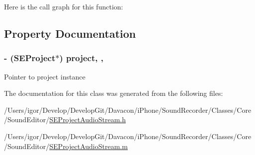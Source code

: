 Here is the call graph for this function\-:




\subsection{Property Documentation}
\hypertarget{interface_s_e_project_audio_stream_ac6d00d41ed2dffb56d3a00533a26e6cd}{
\subsubsection[{project}]{\setlength{\rightskip}{0pt plus 5cm}-\/ ({\bf S\-E\-Project}$\ast$) project\hspace{0.3cm}{\ttfamily [read]}, {\ttfamily [nonatomic]}, {\ttfamily [assign]}}}\label{interface_s_e_project_audio_stream_ac6d00d41ed2dffb56d3a00533a26e6cd}
Pointer to project instance 

The documentation for this class was generated from the following files\-:\begin{DoxyCompactItemize}
\item 
/\-Users/igor/\-Develop/\-Develop\-Git/\-Davacon/i\-Phone/\-Sound\-Recorder/\-Classes/\-Core/\-Sound\-Editor/\hyperlink{_s_e_project_audio_stream_8h}{S\-E\-Project\-Audio\-Stream.\-h}\item 
/\-Users/igor/\-Develop/\-Develop\-Git/\-Davacon/i\-Phone/\-Sound\-Recorder/\-Classes/\-Core/\-Sound\-Editor/\hyperlink{_s_e_project_audio_stream_8m}{S\-E\-Project\-Audio\-Stream.\-m}\end{DoxyCompactItemize}
